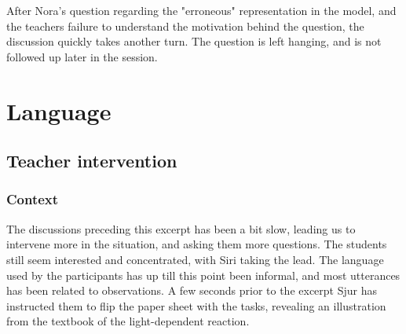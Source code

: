 After Nora's question regarding the "erroneous" representation in the model, and the teachers failure to understand the motivation behind the question, the discussion quickly takes another turn. The question is left hanging, and is not followed up later in the session.  


\section{Language}
\label{cha:language}
\subsection{Teacher intervention}

\subsubsection*{Context}
The discussions preceding this excerpt has been a bit slow, leading us to intervene more in the situation, and asking them more questions. The students still seem interested and concentrated, with Siri taking the lead. The language used by the participants has up till this point been informal, and most utterances has been related to observations. A few seconds prior to the excerpt Sjur has instructed them to flip the paper sheet with the tasks, revealing an illustration from the textbook of the light-dependent reaction. 
